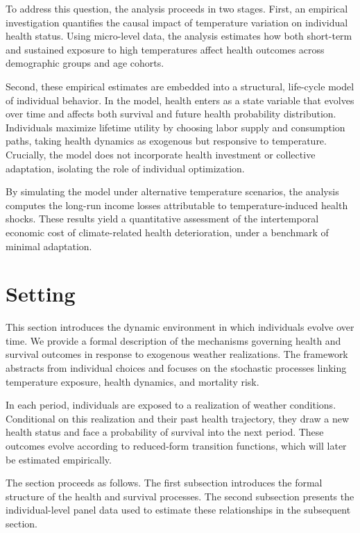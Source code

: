 \documentclass{article}
\begin{document}
To address this question, the analysis proceeds in two stages.
First, an empirical investigation quantifies the causal impact of temperature variation on individual health status.
Using micro-level data, the analysis estimates how both short-term and sustained exposure to high temperatures affect health outcomes across demographic groups and age cohorts.

Second, these empirical estimates are embedded into a structural, life-cycle model of individual behavior.
In the model, health enters as a state variable that evolves over time and affects both survival and future health probability distribution.
Individuals maximize lifetime utility by choosing labor supply and consumption paths, taking health dynamics as exogenous but responsive to temperature.
Crucially, the model does not incorporate health investment or collective adaptation, isolating the role of individual optimization.

By simulating the model under alternative temperature scenarios, the analysis computes the long-run income losses attributable to temperature-induced health shocks. These results yield a quantitative assessment of the intertemporal economic cost of climate-related health deterioration, under a benchmark of minimal adaptation.

\section{Setting}

This section introduces the dynamic environment in which individuals evolve over time. 
We provide a formal description of the mechanisms governing health and survival outcomes in response to exogenous weather realizations. 
The framework abstracts from individual choices and focuses on the stochastic processes linking temperature exposure, health dynamics, and mortality risk.

In each period, individuals are exposed to a realization of weather conditions.
Conditional on this realization and their past health trajectory, they draw a new health status and face a probability of survival into the next period.
These outcomes evolve according to reduced-form transition functions, which will later be estimated empirically.

The section proceeds as follows.
The first subsection introduces the formal structure of the health and survival processes.
The second subsection presents the individual-level panel data used to estimate these relationships in the subsequent section.
\end{document}
